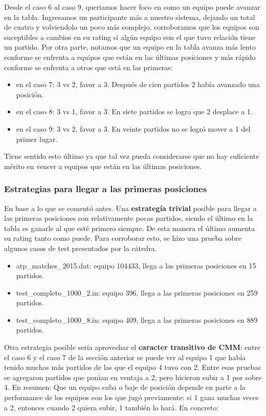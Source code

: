 Desde el caso 6 al caso 9, queriamos hacer foco en como un equipo puede avanzar en la tabla. Ingresamos un participante más a nuestro sistema, dejando un total de cuatro y volviendolo un poco más complejo, corroboramos que los equipos son suceptibles a cambios en su rating si algún equipo con el que tuvo relación tiene un partido. Por otra parte, notamos que un equipo en la tabla avanza más lento conforme se enfrenta a equipos que están en las últimas posiciones y más rápido conforme se enfrenta a otros que está en las primeras:

\begin{itemize}
    \item en el caso 7: 3 vs 2, favor a 3. Después de cien partidos 2 había avanzado una posición.
    \item en el caso 8: 3 vs 1, favor a 3. En siete partidos se logra que 2 desplace a 1.
    \item en el caso 9: 3 vs 2, favor a 3. En veinte partidos no se logró mover a 1 del primer lugar.
\end{itemize}

Tiene sentido esto último ya que tal vez pueda considerarse que no hay suficiente mérito en vencer a equipos que están en las últimas posiciones.

\subsubsection{Estrategias para llegar a las primeras posiciones}

En base a lo que se comentó antes. Una \textbf{estrategía trivial} posible para llegar a las primeras posiciones con relativamente pocas partidos, siendo el último en la tabla es ganarle al que esté primero siempre. De esta manera el último aumenta su rating tanto como puede. Para corroborar esto, se hizo una prueba sobre algunos casos de test presentados por la cátedra.

\begin{itemize}
    \item atp\_matches\_2015.dat: equipo 104433, llega a las primeras posiciones en 15 partidos.
    \item test\_completo\_1000\_2.in: equipo 396, llega a las primeras posiciones en 259 partidos.
    \item test\_completo\_1000\_8.in: equipo 409, llega a las primeras posiciones en 889 partidos.
\end{itemize}

Otra estrategia posible sería aprovechar el \textbf{caracter transitivo de CMM}: entre el caso 6 y el caso 7 de la sección anterior se puede ver al equipo 1 que había tenido muchas más partidos de las que el equipo 4 tuvo con 2. Entre esas pruebas se agregaron partidos que ponian en ventaja a 2, pero hicieron subir a 1 por sobre 4. En resumen: Que un equipo suba o baje de posición depende en parte a la performance de los equipos con los que jugó previamente: si 1 gana muchas veces a 2, entonces cuando 2 quiera subir, 1 también lo hará. En concreto:

